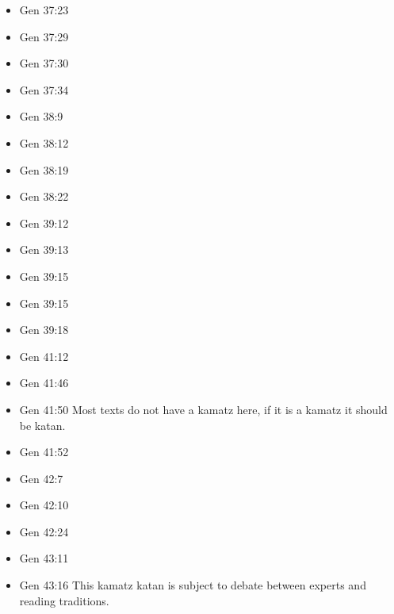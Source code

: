 \documentclass[14pt]{article}
\begin{document}
\begin{multicols}{2}
\begin{itemize}
\item Gen 37:23

\item Gen 37:29

\item Gen 37:30

\item Gen 37:34

\item Gen 38:9

\item Gen 38:12

\item Gen 38:19

\item Gen 38:22

\item Gen 39:12

\item Gen 39:13

\item Gen 39:15

\item Gen 39:15

\item Gen 39:18

\item Gen 41:12

\item Gen 41:46

\item Gen 41:50 Most texts do not have a kamatz here, if it is a kamatz it should be katan.

\item Gen 41:52

\item Gen 42:7

\item Gen 42:10

\item Gen 42:24

\item Gen 43:11

\item Gen 43:16 This kamatz katan is subject to debate between experts and reading traditions.


\end{itemize}
\end{multicols}
\end{document}
